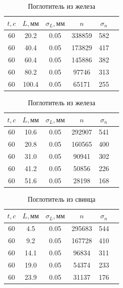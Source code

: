 \documentclass[a4paper,12pt]{article} %
\begin{document}
   \begin{table}[!htb]
    \begin{minipage}{.5\linewidth}
      \centering
      \begin{tabular}{|c|c|c|c|c|c|}
    \hline
      $t, c$  & $L,  \text{мм}$ & $\sigma_L, \text{мм}$ & $n$ & $\sigma_n$ \\ \hline
        60  &  20.2  &  0.05  &   338859  &  582 \\ \hline
        60  &  40.4  &  0.05  &   173829  &  417 \\ \hline
        60  &  60.4  &  0.05  &   145886  &  382 \\ \hline
        60  &  80.2  &  0.05  &    97746  &  313 \\ \hline
        60  &  100.4  &  0.05  &    65171  &  255 \\ \hline
    \end{tabular}
	\centering
	\caption{Поглотитель из алюминия}
	\label{dark}
    \end{minipage}%
    \begin{minipage}{.5\linewidth}
      \centering
    \begin{tabular}{|c|c|c|c|c|c|}
    \hline
      $t, c$  & $L,  \text{мм}$ & $\sigma_L, \text{мм}$ & $n$ & $\sigma_n$ \\ \hline
        60  &  10.6  &  0.05  &   292907  &  541 \\ \hline
        60  &  20.8  &  0.05  &   160565  &  400 \\ \hline
        60  &  31.0  &  0.05  &    90941  &  302 \\ \hline
        60  &  41.2  &  0.05  &    50856  &  226 \\ \hline
        60  &  51.6  &  0.05  &    28198  &  168 \\ \hline
    \end{tabular}
	\centering
	\caption{Поглотитель из железа}
	\label{dark}
    \end{minipage} 
\end{table}

\begin{table}[h!]
    \begin{tabular}{|c|c|c|c|c|c|}
    \hline
      $t, c$  & $L,  \text{мм}$ & $\sigma_L, \text{мм}$ & $n$ & $\sigma_n$ \\ \hline
        60  &  4.5  &  0.05  &   295683  &  544 \\ \hline
        60  &  9.2  &  0.05  &   167728  &  410 \\ \hline
        60  &  14.1  & 0.05  &    96834  &  311 \\ \hline
        60  &  19.0  & 0.05  &    54374  &  233 \\ \hline
        60  &  23.9  & 0.05  &    31137  &  176 \\ \hline
    \end{tabular}
	\centering
	\caption{Поглотитель из свинца}
	\label{dark}
\end{table}
\end{document}
